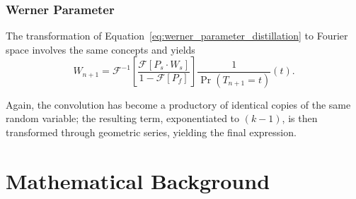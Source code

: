 \documentclass{masterthesis}
\begin{document}
\subsection{Werner Parameter}

The transformation of Equation~\ref{eq:werner_parameter_distillation} to Fourier space involves the same concepts and yields
\begin{equation}\label{eq:werner_parameter_distillation_fourier}
    W_{n+1} = \mathcal{F}^{-1} \left[ \frac{\mathcal{F}[P_s \cdot W_s]}{1 - \mathcal{F}[P_f]} \right] \frac{1}{\Pr(T_{n+1}=t)}(t) .
\end{equation}

Again, the convolution has become a productory of identical copies of the same random variable; the resulting term, exponentiated to $(k-1)$, is then transformed through geometric series, yielding the final expression.



\appendix

\chapter{Mathematical Background}\label{app:math_background} %
\end{document}
